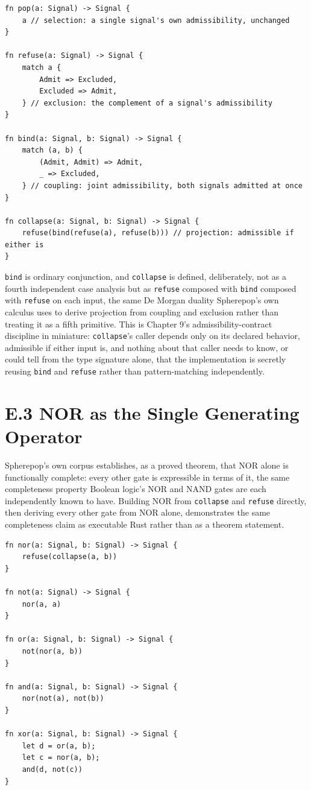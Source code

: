 \documentclass[11pt]{book}
\begin{document}
\begin{lstlisting}
fn pop(a: Signal) -> Signal {
    a // selection: a single signal's own admissibility, unchanged
}

fn refuse(a: Signal) -> Signal {
    match a {
        Admit => Excluded,
        Excluded => Admit,
    } // exclusion: the complement of a signal's admissibility
}

fn bind(a: Signal, b: Signal) -> Signal {
    match (a, b) {
        (Admit, Admit) => Admit,
        _ => Excluded,
    } // coupling: joint admissibility, both signals admitted at once
}

fn collapse(a: Signal, b: Signal) -> Signal {
    refuse(bind(refuse(a), refuse(b))) // projection: admissible if either is
}
\end{lstlisting}

\texttt{bind} is ordinary conjunction, and \texttt{collapse} is defined, deliberately, not as a fourth independent case analysis but as \texttt{refuse} composed with \texttt{bind} composed with \texttt{refuse} on each input, the same De Morgan duality Spherepop's own calculus uses to derive projection from coupling and exclusion rather than treating it as a fifth primitive. This is Chapter 9's admissibility-contract discipline in miniature: \texttt{collapse}'s caller depends only on its declared behavior, admissible if either input is, and nothing about that caller needs to know, or could tell from the type signature alone, that the implementation is secretly reusing \texttt{bind} and \texttt{refuse} rather than pattern-matching independently.

\section*{E.3 NOR as the Single Generating Operator}

Spherepop's own corpus establishes, as a proved theorem, that NOR alone is functionally complete: every other gate is expressible in terms of it, the same completeness property Boolean logic's NOR and NAND gates are each independently known to have. Building NOR from \texttt{collapse} and \texttt{refuse} directly, then deriving every other gate from NOR alone, demonstrates the same completeness claim as executable Rust rather than as a theorem statement.

\begin{lstlisting}
fn nor(a: Signal, b: Signal) -> Signal {
    refuse(collapse(a, b))
}

fn not(a: Signal) -> Signal {
    nor(a, a)
}

fn or(a: Signal, b: Signal) -> Signal {
    not(nor(a, b))
}

fn and(a: Signal, b: Signal) -> Signal {
    nor(not(a), not(b))
}

fn xor(a: Signal, b: Signal) -> Signal {
    let d = or(a, b);
    let c = nor(a, b);
    and(d, not(c))
}
\end{lstlisting}
\end{document}
